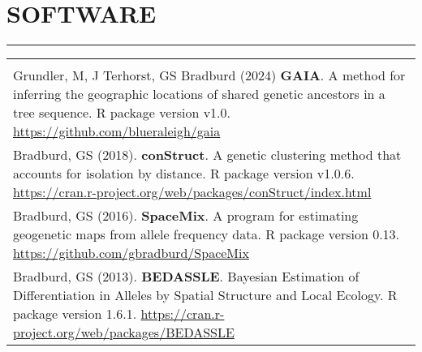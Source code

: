 \documentclass{gbcv}
\begin{document}
\section*{SOFTWARE}
\vspace{-0.6cm}
\rule{470pt}{0.4pt}
\begin{tabular}{>{\everypar{\hangindent1cm}}p{}}
\hfill\\
%
Grundler, M, J Terhorst, GS Bradburd (2024) \textbf{GAIA}. A method for inferring the geographic locations of 
shared genetic ancestors in a tree sequence. R package version v1.0.
\href{https://github.com/blueraleigh/gaia}{https://github.com/blueraleigh/gaia}\\
%
\vspace{-0.1cm}
%
Bradburd, GS (2018). \textbf{conStruct}. A genetic clustering method that accounts for isolation by distance. R package version v1.0.6.
\href{https://cran.r-project.org/web/packages/conStruct/index.html}{https://cran.r-project.org/web/packages/conStruct/index.html}\\
%
\vspace{-0.1cm}
%
Bradburd, GS (2016). \textbf{SpaceMix}. A program for estimating geogenetic maps from allele frequency data. R package version 0.13.
\href{https://github.com/gbradburd/SpaceMix}{https://github.com/gbradburd/SpaceMix}\\
%
\vspace{-0.1cm}
%
Bradburd, GS (2013). \textbf{BEDASSLE}. Bayesian Estimation of Differentiation in Alleles by Spatial Structure and Local Ecology. 
R package version 1.6.1. \href{https://cran.r-project.org/web/packages/BEDASSLE}{https://cran.r-project.org/web/packages/BEDASSLE}\\
%
\end{tabular}
%
\end{document}
